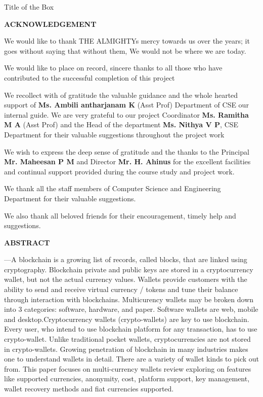 \documentclass[12pt]{article}
\begin{document}
\begin{boxed}{Title of the Box}
\newpage
\vspace*{50px}
\begin{center}\LARGE\bf{ACKNOWLEDGEMENT}\end{center}

\thispagestyle{empty}We would like to thank THE ALMIGHTYs mercy towards us over the years;
it goes without saying that without them, We would not be where we are today. \\
\par We would like to place on record, sincere thanks to all those who have
contributed to the successful completion of this project\\
\par We recollect with of gratitude the valuable guidance and the whole hearted support of \textbf{Ms. Ambili antharjanam K} (Asst Prof) Department of CSE our internal guide. We are very grateful to our project Coordinator\textbf{ Ms. Ramitha M A} (Asst Prof) and the Head of the department\textbf{ Ms. Nithya V P}, CSE Department for their valuable suggestions throughout the project work\\
\par We wish to express the deep sense of gratitude and the thanks to the Principal \textbf{Mr. Maheesan P M} and Director\textbf{ Mr. H. Ahinus} for the excellent facilities and continual support provided during the course study and project work. \\
\par We thank all the staff members of Computer Science and Engineering Department for their valuable suggestions. \\
\par We also thank all beloved friends for their encouragement, timely help and suggestions.\\

\newpage
\vspace*{50px}
\begin{center} \large \bf{ABSTRACT} \end{center}
               
\vspace{30px}
—A blockchain is a growing list of records, 
called blocks, that are linked using cryptography. 
Blockchain private and public keys are stored in a 
cryptocurrency wallet, but not the actual currency 
values. Wallets provide customers with the ability to 
send and receive virtual currency / tokens and tune their 
balance through interaction with blockchains. Multicurency wallets may be broken down into 3 categories: 
software, hardware, and paper. Software wallets are 
web, mobile and desktop.Cryptocurrency wallets (crypto-wallets) are key to use
blockchain. Every user, who intend to use blockchain
platform for any transaction, has to use crypto-wallet.
Unlike traditional pocket wallets, cryptocurrencies are not
stored in crypto-wallets. Growing penetration of 
blockchain in many industries makes one to understand 
wallets in detail. There are a variety of wallet kinds to 
pick out from. This paper focuses on multi-currency 
wallets review exploring on features like supported 
currencies, anonymity, cost, platform support, key 
management, wallet recovery methods and fiat 
currencies supported.


\end{boxed}
\end{document}
